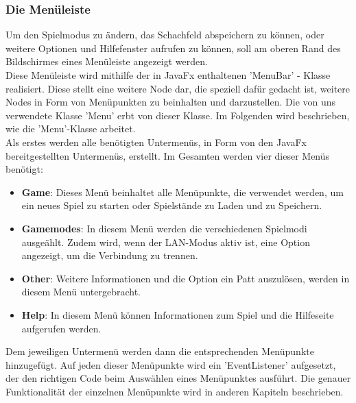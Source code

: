 \documentclass[12pt,a4paper]{article}
\begin{document}
\subsubsection{Die Menüleiste}
Um den Spielmodus zu ändern, das Schachfeld abspeichern zu können, oder weitere Optionen und Hilfefenster aufrufen zu können, soll am oberen Rand des Bildschirmes eines Menüleiste angezeigt werden. \\
Diese Menüleiste wird mithilfe der in JavaFx enthaltenen 'MenuBar' - Klasse realisiert. Diese stellt eine weitere Node dar, die speziell dafür gedacht ist, weitere Nodes in Form von Menüpunkten zu beinhalten und darzustellen.  Die von uns verwendete Klasse 'Menu' erbt von dieser Klasse. Im Folgenden wird beschrieben, wie die 'Menu'-Klasse arbeitet. \\
Als erstes werden alle benötigten Untermenüs, in Form von den JavaFx bereitgestellten Untermenüs, erstellt. Im Gesamten werden vier dieser Menüs benötigt:
\begin{itemize}

	\item{\textbf{Game}: Dieses Menü beinhaltet alle Menüpunkte, die verwendet werden, um ein neues Spiel zu starten oder Spielstände zu Laden und zu Speichern.}
	
	\item{\textbf{Gamemodes}: In diesem Menü werden die verschiedenen Spielmodi ausgeählt. Zudem wird, wenn der LAN-Modus aktiv ist, eine Option angezeigt, um die Verbindung zu trennen.  
	}
	\item{\textbf{Other}: Weitere Informationen und die Option ein Patt auszulösen, werden in diesem Menü untergebracht.}
	\item{\textbf{Help}: In diesem Menü können Informationen zum Spiel und die Hilfeseite aufgerufen werden. }
\end{itemize}
Dem jeweiligen Untermenü werden dann die entsprechenden Menüpunkte hinzugefügt. Auf jeden dieser Menüpunkte wird ein 'EventListener' aufgesetzt, der den richtigen Code beim Auswählen eines Menüpunktes ausführt. Die genauer Funktionalität der einzelnen Menüpunkte wird in anderen Kapiteln beschrieben. 
\end{document}
